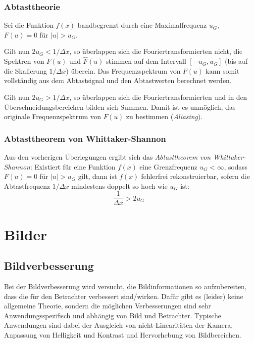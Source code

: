 		\subsection{Abtasttheorie}
			Sei die Funktion \( f(x) \) bandbegrenzt durch eine Maximalfrequenz \( u_G \), \dh \( F(u) = 0 \) für \( \lvert u \rvert > u_G \).

			Gilt nun \( 2u_G < 1 / \Delta x \), so überlappen sich die Fouriertransformierten nicht, \dh die Spektren von \( F(u) \) und \( \hat{F}(u) \) stimmen auf dem Intervall \( [-u_G, u_G] \) (bis auf die Skalierung \( 1 / \Delta x \)) überein. Das Frequenzspektrum von \( F(u) \) kann somit vollständig aus dem Abtastsignal und den Abtastwerten berechnet werden.

			Gilt nun \( 2u_G > 1 / \Delta x \), so überlappen sich die Fouriertransformierten und in den Überschneidungsbereichen bilden sich Summen. Damit ist es unmöglich, das originale Frequenzspektrum von \( F(u) \) zu bestimmen (\emph{Aliasing}).

		\subsection{Abtasttheorem von Whittaker-Shannon}
			Aus den vorherigen Überlegungen ergibt sich das \emph{Abtasttheorem von Whittaker-Shannon}: Existiert für eine Funktion \( f(x) \) eine Grenzfrequenz \( u_G < \infty \), sodass \( F(u) = 0 \) für \( \lvert u \rvert > u_G \) gilt, dann ist \( f(x) \) fehlerfrei rekonstruierbar, sofern die Abtastfrequenz \( 1 / \Delta x \) mindestens doppelt so hoch wie \( u_G \) ist:
			\begin{equation*}
				\frac{1}{\Delta x} > 2 u_G
			\end{equation*}

\chapter{Bilder}
	\section{Bildverbesserung}
		Bei der Bildverbesserung wird versucht, die Bildinformationen so aufzubereiten, dass die für den Betrachter verbessert sind/wirken. Dafür gibt es (leider) keine allgemeine Theorie, sondern die möglichen Verbesserungen sind sehr Anwendungsspezifisch und abhängig von Bild und Betrachter. Typische Anwendungen sind dabei der Ausgleich von nicht-Linearitäten der Kamera, Anpassung von Helligkeit und Kontrast und Hervorhebung von Bildbereichen.

